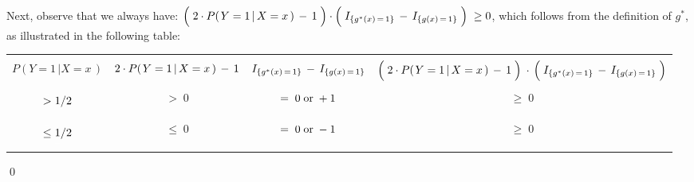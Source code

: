 Next, observe that we always have:
$\left(\; 2 \cdot P\!\left(\left.Y=1\,\right\vert X =x \,\right) \,\overset{{\color{white}.}}{-}\, 1 \;\right)
\cdot
\left(\; I_{\{g^{*}(x)\,=\,1\}} \,\overset{{\color{white}.}}{-}\, I_{\{g(x)\,=\,1\}} \;\right) \; \geq 0$,
which follows from the definition of $g^{*}$, as illustrated in the following table:
{\footnotesize
\begin{center}
\begin{tabular}{|c||c|c|c|}
\hline
&&&\\
	$P\!\left(\left.Y=1\,\right\vert X =x \,\right)$ &
	$2 \cdot P\!\left(\left.Y=1\,\right\vert X =x \,\right) \,\overset{{\color{white}.}}{-}\, 1$ &
	$I_{\{g^{*}(x)\,=\,1\}} \,\overset{{\color{white}.}}{-}\, I_{\{g(x)\,=\,1\}}$ &
	$\left(\; 2 \cdot P\!\left(\left.Y=1\,\right\vert X =x \,\right) \,\overset{{\color{white}.}}{-}\, 1 \;\right)$
	$\cdot$
	$\left(\; I_{\{g^{*}(x)\,=\,1\}} \,\overset{{\color{white}.}}{-}\, I_{\{g(x)\,=\,1\}} \;\right)$
\\
&&&\\
\hline
	$\underset{{\color{white}-}}{\overset{{\color{white}-}}{>} 1/2}$ &
	$ >\; 0 $ &
	$ =\; 0 \;\textnormal{or}\; +1$ &
	$ \geq\; 0 $
\\
\hline
	$\underset{{\color{white}-}}{\overset{{\color{white}-}}{\leq} 1/2}$ &
	$ \leq\; 0$ &
	$ =\; 0 \;\textnormal{or}\; -1$ &
	$ \geq\; 0 $
\\
\hline
\end{tabular}
\end{center}
}
\qed



\renewcommand{\theenumi}{\roman{enumi}}
\renewcommand{\labelenumi}{\textnormal{(\theenumi)}$\;\;$}

